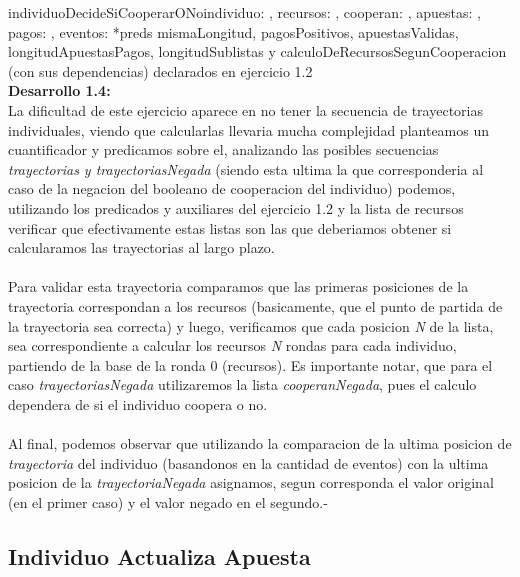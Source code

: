 \documentclass[10pt,a4paper]{article}
\begin{document}
\begin{proc}{individuoDecideSiCooperarONo}{\In individuo: \nat, \In recursos: \TLista{\float}, \Inout cooperan: \TLista{\bool}, \In apuestas: \TLista{\TLista{\float}}, \In pagos: \TLista{\float}, \In eventos: \TLista{\TLista{\nat}}}{}
    *preds mismaLongitud, pagosPositivos, apuestasValidas, longitudApuestasPagos, longitudSublistas y calculoDeRecursosSegunCooperacion (con sus dependencias) declarados en ejercicio 1.2
\\
\textbf{Desarrollo 1.4:}
\\
 La dificultad de este ejercicio aparece en no tener la secuencia de trayectorias individuales, viendo que calcularlas llevaria mucha complejidad planteamos un cuantificador y predicamos sobre el, analizando las posibles secuencias \textit{trayectorias y trayectoriasNegada} (siendo esta ultima la que corresponderia al caso de la negacion del booleano de cooperacion del individuo) podemos, utilizando los predicados y auxiliares del ejercicio 1.2 y la lista de recursos verificar que efectivamente estas listas son las que deberiamos obtener si calcularamos las trayectorias al largo plazo. \\ \\
Para validar esta trayectoria comparamos que las primeras posiciones de la trayectoria correspondan a los recursos (basicamente, que el punto de partida de la trayectoria sea correcta) y luego, verificamos que cada posicion \textit{N} de la lista, sea correspondiente a calcular los recursos \textit{N} rondas para cada individuo, partiendo de la base de la ronda 0 (recursos). Es importante notar, que para el caso \textit{trayectoriasNegada} utilizaremos la lista \textit{cooperanNegada}, pues el calculo dependera de si el individuo coopera o no.
\\ \\
Al final, podemos observar que utilizando la comparacion de la ultima posicion de \textit{trayectoria} del individuo (basandonos en la cantidad de eventos) con la ultima posicion de la \textit{trayectoriaNegada} asignamos, segun corresponda el valor original (en el primer caso) y el valor negado en el segundo.-


\end{proc}

\subsection{Individuo Actualiza Apuesta}
\end{document}
